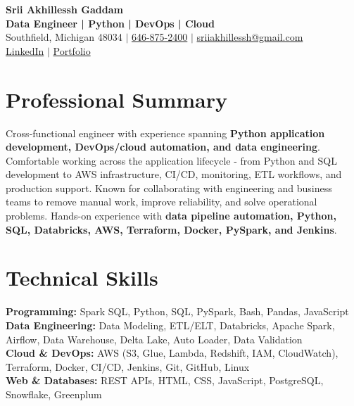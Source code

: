 \documentclass[letterpaper,10pt]{article}
\begin{document}
\fontsize{9.35pt}{10.45pt}\selectfont

\begin{center}
    {\LARGE \textbf{Srii Akhillessh Gaddam}} \\[-1pt]
    \textbf{Data Engineer | Python | DevOps | Cloud} \\[2pt]
    Southfield, Michigan 48034 $|$
    \href{tel:6468752400}{646-875-2400} $|$
    \href{mailto:sriiakhillessh@gmail.com}{sriiakhillessh@gmail.com} \\[1pt]
    \href{https://www.linkedin.com/in/srii-akhiilessh-gaddam-b48668191/}{LinkedIn} $|$
    \href{https://sriiakhillesshg.github.io/portfolio/}{Portfolio}
\end{center}
\vspace{-8pt}

\section{Professional Summary}
\small{Cross-functional engineer with experience spanning \textbf{Python application development, DevOps/cloud automation, and data engineering}. Comfortable working across the application lifecycle - from Python and SQL development to AWS infrastructure, CI/CD, monitoring, ETL workflows, and production support. Known for collaborating with engineering and business teams to remove manual work, improve reliability, and solve operational problems. Hands-on experience with \textbf{data pipeline automation, Python, SQL, Databricks, AWS, Terraform, Docker, PySpark, and Jenkins}.}

\section{Technical Skills}
\small{
\textbf{Programming:} Spark SQL, Python, SQL, PySpark, Bash, Pandas, JavaScript \\
\textbf{Data Engineering:} Data Modeling, ETL/ELT, Databricks, Apache Spark, Airflow, Data Warehouse, Delta Lake, Auto Loader, Data Validation \\
\textbf{Cloud \& DevOps:} AWS (S3, Glue, Lambda, Redshift, IAM, CloudWatch), Terraform, Docker, CI/CD, Jenkins, Git, GitHub, Linux \\
\textbf{Web \& Databases:} REST APIs, HTML, CSS, JavaScript, PostgreSQL, Snowflake, Greenplum
}
\end{document}
